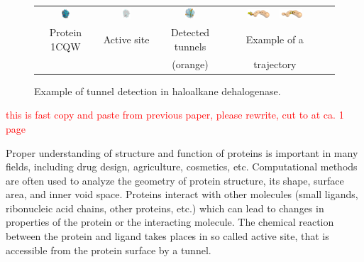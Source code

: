\documentclass{svmult}
\newcommand{\red}[1]{\textcolor{red}{#1}}
\begin{document}
\begin{figure}[t]
\centering
{\footnotesize
\renewcommand{\arraystretch}{0.1}
\renewcommand{\tabcolsep}{0pt}
\begin{tabular}{ccccc}
\includegraphics[width=0.15\textwidth]{fig/motiv1} &
\includegraphics[width=0.17\textwidth]{fig/motiv2lab} &
\includegraphics[width=0.16\textwidth]{fig/motiv3} &
\hbox{
\vbox{
\hbox{\includegraphics[width=0.25\textwidth]{fig/ta-1} }
\hbox{\includegraphics[width=0.25\textwidth]{fig/ta-433}}
} 
}
\\
Protein 1CQW & Active site & Detected tunnels & Example of a  \\
             &            & (orange)          & trajectory
\end{tabular}
}
\caption{\label{fig::motiv}
    Example of tunnel detection in haloalkane dehalogenase.
}
\end{figure}




\red{this is fast copy and paste from previous paper, please rewrite, cut to at ca. 1 page}

Proper understanding of structure and function of proteins is important in many fields, including drug design, agriculture, cosmetics, etc.
Computational methods are often used to analyze the geometry of protein structure,  its shape, surface area, and inner void space. 
Proteins interact with other molecules (small ligands, ribonucleic acid chains, other proteins, etc.) which can lead to changes in properties of the protein or the interacting molecule.
The chemical reaction between the protein and ligand takes places in so called active site, that is accessible 
from the protein surface by a tunnel.
\end{document}
